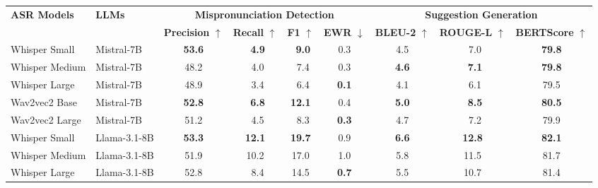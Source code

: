 \begin{table}[t]
\centering

\setlength{\tabcolsep}{3pt}
\small
\begin{tabular}{llccccccc} 
\toprule[1pt]
\multirow{2}{*}{\textbf{ASR Models}} & \multirow{2}{*}{\textbf{LLMs}}& \multicolumn{4}{c}{\textbf{Mispronunciation Detection}} & \multicolumn{3}{c}{\textbf{Suggestion Generation}} \\ 
\cmidrule(lr){3-6} \cmidrule(lr){7-9}
 &  & \textbf{Precision} $\uparrow$ & \textbf{Recall} $\uparrow$ & \textbf{F1} $\uparrow$ & \textbf{EWR} $\downarrow$ & \textbf{BLEU-2} $\uparrow$ & \textbf{ROUGE-L} $\uparrow$ & \textbf{BERTScore} $\uparrow$ \\ 
\midrule[0.5pt]
Whisper Small     & Mistral-7B     & \textbf{53.6} & \,\,\,\textbf{4.9} & \,\,\,\textbf{9.0}  & 0.3 & 4.5 & \,\,\,7.0 & \textbf{79.8} \\
Whisper Medium    & Mistral-7B     & 48.2 & \,\,\,4.0  & \,\,\,7.4  & 0.3 & \textbf{4.6} & \,\,\,\textbf{7.1} & \textbf{79.8} \\
Whisper Large     & Mistral-7B     & 48.9 & \,\,\,3.4  & \,\,\,6.4  & \textbf{0.1} & 4.1 & \,\,\,6.1 & 79.5 \\
\midrule[0.5pt]
Wav2vec2 Base     & Mistral-7B     & \textbf{52.8} & \,\,\,\textbf{6.8}  & \textbf{12.1} & 0.4 & \textbf{5.0} & \,\,\,\textbf{8.5} & \textbf{80.5} \\
Wav2vec2 Large    & Mistral-7B     & 51.2 & \,\,\,4.5  & \,\,\,8.3  & \textbf{0.3} & 4.7 & \,\,\,7.2 & 79.9 \\
\midrule
Whisper Small     & Llama-3.1-8B        & \textbf{53.3} & \textbf{12.1} & \textbf{19.7} & 0.9 & \textbf{6.6} & \textbf{12.8} & \textbf{82.1} \\
Whisper Medium    & Llama-3.1-8B        & 51.9 & 10.2 & 17.0 & 1.0 & 5.8 & 11.5 & 81.7 \\
Whisper Large     & Llama-3.1-8B       & 52.8 & \,\,\,8.4  & 14.5 & \textbf{0.7} & 5.5 & 10.7 & 81.4 \\

\end{tabular}
\end{table}
